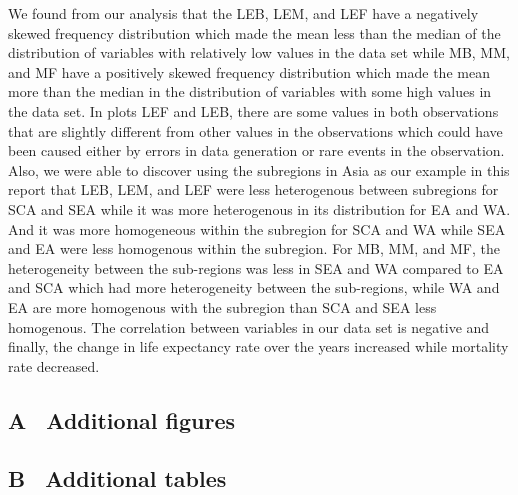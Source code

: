 \documentclass[12 pt]{scrartcl}
\begin{document}
We found from our analysis that the LEB, LEM, and LEF have a negatively skewed frequency distribution which made the mean less than the median of the distribution of variables with relatively low values in the data set while MB, MM, and MF have a positively skewed frequency distribution which made the mean more than the median in the distribution of variables with some high values in the data set. In plots LEF and LEB, there are some values in both observations that are slightly different from other values in the observations which could have been caused either by errors in data generation or rare events in the observation.
Also, we were able to discover using the subregions in Asia as our example in this report that LEB, LEM, and LEF were less heterogenous between subregions for SCA and SEA while it was more heterogenous in its distribution for EA and WA. And it was more homogeneous within the subregion for SCA and WA while SEA and EA were less homogenous within the subregion. For MB, MM, and MF, the heterogeneity between the sub-regions was less in SEA and WA compared to EA and SCA which had more heterogeneity between the sub-regions, while WA and EA are more homogenous with the subregion than SCA and SEA less homogenous.
The correlation between variables in our data set is negative and finally, the change in life expectancy rate over the years increased while mortality rate decreased. 




\newpage
{}
\renewcommand\refname{Bibliography} 




\newpage
\appendix 
{}
\subsection*{A \ Additional figures}
\subsection*{B \ Additional tables}
\end{document}
